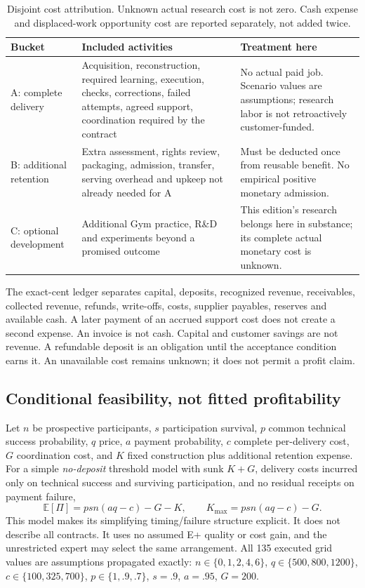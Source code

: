 \documentclass[11pt]{article}
\begin{document}
\begin{table}[htbp]
\small
\begin{tabularx}{\textwidth}{lYY}
\toprule
Bucket & Included activities & Treatment here\\
\midrule
A: complete delivery & Acquisition, reconstruction, required learning, execution, checks, corrections, failed attempts, agreed support, coordination required by the contract & No actual paid job. Scenario values are assumptions; research labor is not retroactively customer-funded.\\
B: additional retention & Extra assessment, rights review, packaging, admission, transfer, serving overhead and upkeep not already needed for A & Must be deducted once from reusable benefit. No empirical positive monetary admission.\\
C: optional development & Additional Gym practice, R\&D and experiments beyond a promised outcome & This edition's research belongs here in substance; its complete actual monetary cost is unknown.\\
\bottomrule
\end{tabularx}
\caption{Disjoint cost attribution. Unknown actual research cost is not zero. Cash expense and displaced-work opportunity cost are reported separately, not added twice.}
\end{table}

The exact-cent ledger separates capital, deposits, recognized revenue, receivables, collected revenue, refunds, write-offs, costs, supplier payables, reserves and available cash. A later payment of an accrued support cost does not create a second expense. An invoice is not cash. Capital and customer savings are not revenue. A refundable deposit is an obligation until the acceptance condition earns it. An unavailable cost remains unknown; it does not permit a profit claim.

\subsection{Conditional feasibility, not fitted profitability}

Let $n$ be prospective participants, $s$ participation survival, $p$ common technical success probability, $q$ price, $a$ payment probability, $c$ complete per-delivery cost, $G$ coordination cost, and $K$ fixed construction plus additional retention expense. For a simple \emph{no-deposit} threshold model with sunk $K+G$, delivery costs incurred only on technical success and surviving participation, and no residual receipts on payment failure,
\begin{equation}
\mathbb{E}[\Pi]=psn(aq-c)-G-K,\qquad
K_{\max}=psn(aq-c)-G.
\end{equation}
This model makes its simplifying timing/failure structure explicit. It does not describe all contracts. It uses no assumed E+ quality or cost gain, and the unrestricted expert may select the same arrangement. All 135 executed grid values are assumptions propagated exactly: $n\in\{0,1,2,4,6\}$, $q\in\{500,800,1200\}$, $c\in\{100,325,700\}$, $p\in\{1,.9,.7\}$, $s=.9$, $a=.95$, $G=200$.
\end{document}
